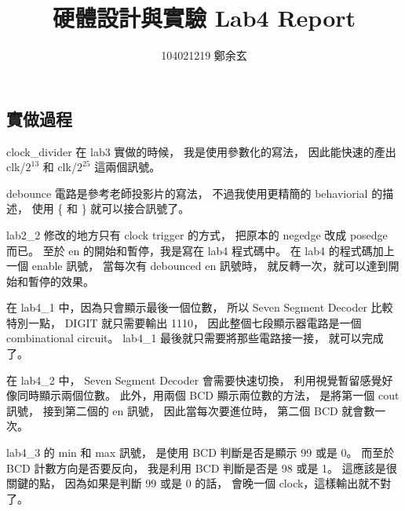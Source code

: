 \documentclass{article}
\begin{document}
\begin{CJK}{UTF8}{bsmi}
\title{硬體設計與實驗 Lab4 Report}
\author{
104021219 鄭余玄
}
\date{}
\maketitle
\section{實做過程}
clock\_divider 在 lab3 實做的時候，
我是使用參數化的寫法，
因此能快速的產出 clk/$2^{13}$ 和 clk/$2^{25}$ 這兩個訊號。

debounce 電路是參考老師投影片的寫法，
不過我使用更精簡的 behaviorial 的描述，
使用 \{ 和 \} 就可以接合訊號了。

lab2\_2 修改的地方只有 clock trigger 的方式，
把原本的 negedge 改成 posedge 而已。
至於 en 的開始和暫停，我是寫在 lab4 程式碼中。
在 lab4 的程式碼加上一個 enable 訊號，
當每次有 debounced en 訊號時，
就反轉一次，就可以達到開始和暫停的效果。

在 lab4\_1 中，因為只會顯示最後一個位數，
所以 Seven Segment Decoder 比較特別一點，
DIGIT 就只需要輸出 1110，
因此整個七段顯示器電路是一個 combinational circuit。
lab4\_1 最後就只需要將那些電路接一接，
就可以完成了。

在 lab4\_2 中，
Seven Segment Decoder 會需要快速切換，
利用視覺暫留感覺好像同時顯示兩個位數。
此外，用兩個 BCD 顯示兩位數的方法，
是將第一個 cout 訊號，
接到第二個的 en 訊號，
因此當每次要進位時，
第二個 BCD 就會數一次。

lab4\_3 的 min 和 max 訊號，
是使用 BCD 判斷是否是顯示 99 或是 0。
而至於 BCD 計數方向是否要反向，
我是利用 BCD 判斷是否是 98 或是 1。
這應該是很關鍵的點，
因為如果是判斷 99 或是 0 的話，
會晚一個 clock，這樣輸出就不對了。


\end{CJK}
\end{document}
